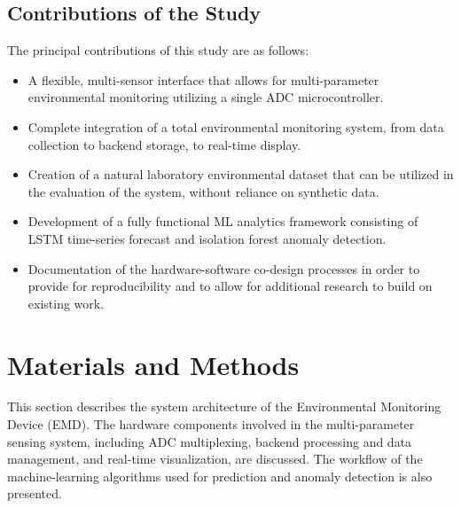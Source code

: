﻿\documentclass[journal]{IEEEtran}
\begin{document}
\subsection{Contributions of the Study}

The principal contributions of this study are as follows:

\begin{itemize}
    \item A flexible, multi-sensor interface that allows for multi-parameter
    environmental monitoring utilizing a single ADC microcontroller.

    \item Complete integration of a total environmental monitoring system,
    from data collection to backend storage, to real-time display.

    \item Creation of a natural laboratory environmental dataset that can
    be utilized in the evaluation of the system, without reliance on
    synthetic data.

    \item Development of a fully functional ML analytics framework consisting
    of LSTM time-series forecast and isolation forest anomaly detection.

    \item Documentation of the hardware-software co-design processes in
    order to provide for reproducibility and to allow for additional
    research to build on existing work.
\end{itemize}

\section{Materials and Methods}

This section describes the system architecture of the Environmental
Monitoring Device (EMD). The hardware components involved in the
multi-parameter sensing system, including ADC multiplexing, backend
processing and data management, and real-time visualization, are discussed.
The workflow of the machine-learning algorithms used for prediction and
anomaly detection is also presented.
\end{document}
